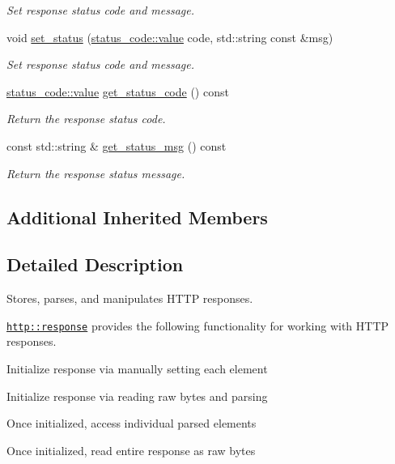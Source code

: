 \begin{DoxyCompactItemize}
\begin{DoxyCompactList}\small\item\em Set response status code and message. \end{DoxyCompactList}\item 
void \hyperlink{classwebsocketpp_1_1http_1_1parser_1_1response_ab673f0371af7934e8abb6946a2952f57}{set\+\_\+status} (\hyperlink{namespacewebsocketpp_1_1http_1_1status__code_ae0d61c309e053ee5673517b54e2886c6}{status\+\_\+code\+::value} code, std\+::string const \&msg)
\begin{DoxyCompactList}\small\item\em Set response status code and message. \end{DoxyCompactList}\item 
\hyperlink{namespacewebsocketpp_1_1http_1_1status__code_ae0d61c309e053ee5673517b54e2886c6}{status\+\_\+code\+::value} \hyperlink{classwebsocketpp_1_1http_1_1parser_1_1response_a356c7fb3813a4e9bb0365f300faf7fb0}{get\+\_\+status\+\_\+code} () const 
\begin{DoxyCompactList}\small\item\em Return the response status code. \end{DoxyCompactList}\item 
const std\+::string \& \hyperlink{classwebsocketpp_1_1http_1_1parser_1_1response_a8cfa8540121117deb16045e5cb76329c}{get\+\_\+status\+\_\+msg} () const 
\begin{DoxyCompactList}\small\item\em Return the response status message. \end{DoxyCompactList}\end{DoxyCompactItemize}
\subsection*{Additional Inherited Members}


\subsection{Detailed Description}
Stores, parses, and manipulates H\+T\+T\+P responses. 

\href{http::response}{\tt http\+::response} provides the following functionality for working with H\+T\+T\+P responses.


\begin{DoxyItemize}
\item Initialize response via manually setting each element
\item Initialize response via reading raw bytes and parsing
\item Once initialized, access individual parsed elements
\item Once initialized, read entire response as raw bytes
\end{DoxyItemize}


